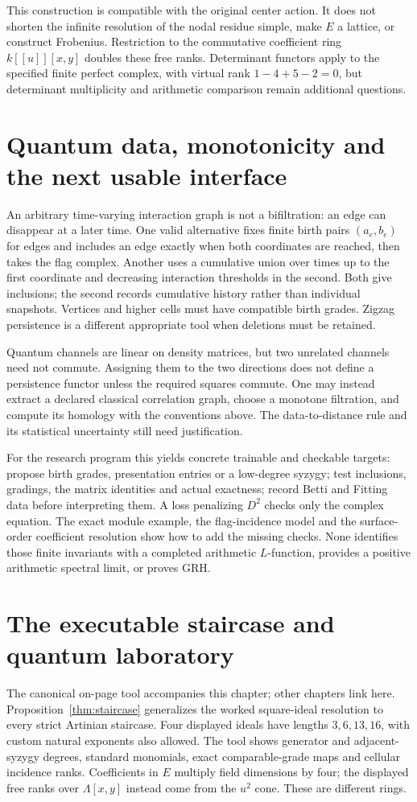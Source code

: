 This construction is compatible with the original center action. It does
not shorten the infinite resolution of the nodal residue simple, make
$E$ a lattice, or construct Frobenius. Restriction to the commutative
coefficient ring $k[[u]][x,y]$ doubles these free ranks. Determinant
functors apply to the specified finite perfect complex, with virtual
rank $1-4+5-2=0$, but determinant multiplicity and arithmetic comparison
remain additional questions.

\section{Quantum data, monotonicity and the next usable interface}
An arbitrary time-varying interaction graph is not a bifiltration: an
edge can disappear at a later time. One valid alternative fixes finite
birth pairs $(a_e,b_e)$ for edges and includes an edge exactly when both
coordinates are reached, then takes the flag complex. Another uses a
cumulative union over times up to the first coordinate and decreasing
interaction thresholds in the second. Both give inclusions; the second
records cumulative history rather than individual snapshots. Vertices
and higher cells must have compatible birth grades. Zigzag persistence
is a different appropriate tool when deletions must be retained.

Quantum channels are linear on density matrices, but two unrelated
channels need not commute. Assigning them to the two directions does
not define a persistence functor unless the required squares commute.
One may instead extract a declared classical correlation graph, choose
a monotone filtration, and compute its homology with the conventions
above. The data-to-distance rule and its statistical uncertainty still
need justification.

For the research program this yields concrete trainable and checkable
targets: propose birth grades, presentation entries or a low-degree
syzygy; test inclusions, gradings, the matrix identities and actual
exactness; record Betti and Fitting data before interpreting them.
A loss penalizing $D^2$ checks only the complex equation. The exact
module example, the flag-incidence model and the surface-order coefficient
resolution show how to add the missing checks. None identifies those
finite invariants with a completed arithmetic $L$-function, provides a
positive arithmetic spectral limit, or proves GRH.

\section{The executable staircase and quantum laboratory}
The canonical on-page tool accompanies this chapter; other chapters link
here. Proposition~\ref{thm:staircase} generalizes the worked square-ideal
resolution to every strict Artinian staircase. Four displayed ideals have
lengths $3,6,13,16$, with custom natural exponents also allowed. The tool
shows generator and adjacent-syzygy degrees, standard monomials, exact
comparable-grade maps and cellular incidence ranks. Coefficients in $E$
multiply field dimensions by four; the displayed free ranks over
$\Lambda[x,y]$ instead come from the $u^2$ cone. These are different rings.

